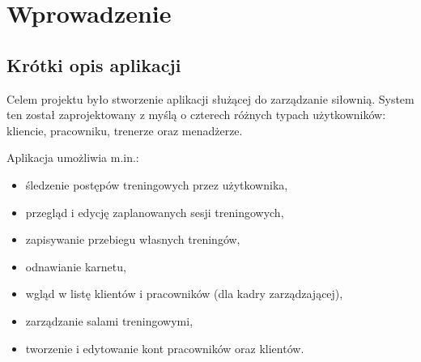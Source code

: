 \documentclass[../../spr.tex]{subfiles}
\begin{document}
\section{Wprowadzenie}

\subsection{Krótki opis aplikacji}
Celem projektu było stworzenie aplikacji służącej do zarządzanie siłownią. System ten został zaprojektowany z myślą o czterech różnych typach użytkowników: kliencie, pracowniku, trenerze oraz menadżerze.

Aplikacja umożliwia m.in.:
\begin{itemize}
    \item śledzenie postępów treningowych przez użytkownika,
    \item przegląd i edycję zaplanowanych sesji treningowych,
    \item zapisywanie przebiegu własnych treningów,
    \item odnawianie karnetu,
    \item wgląd w listę klientów i pracowników (dla kadry zarządzającej),
    \item zarządzanie salami treningowymi,
    \item tworzenie i edytowanie kont pracowników oraz klientów.
\end{itemize}
\end{document}
